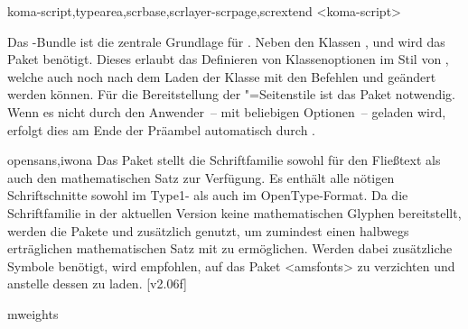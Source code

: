 \begin{packages}
\item[koma-script,typearea,scrbase,scrlayer-scrpage,scrextend]<koma-script>
  \begin{Declaration*}{}
  \begin{Declaration*}{}
  \begin{Declaration*}{}
  \begin{Declaration*}{}
  Das \KOMAScript-Bundle ist die zentrale Grundlage für \TUDScript. Neben den 
  Klassen ,  und  wird das Paket 
   benötigt. Dieses erlaubt das Definieren von Klassenoptionen 
  im Stil von \KOMAScript, welche auch noch nach dem Laden der Klasse mit den 
  Befehlen  und  geändert werden können. Für 
  die Bereitstellung der "=Seitenstile ist das Paket 
   notwendig. Wenn es nicht durch den Anwender~-- mit 
  beliebigen Optionen~-- geladen wird, erfolgt dies am Ende der Präambel 
  automatisch durch \TUDScript.
  \end{Declaration*}
  \end{Declaration*}
  \end{Declaration*}
  \end{Declaration*}
\item[opensans,iwona]
  Das Paket  stellt die Schriftfamilie \OpenSans sowohl für 
  den Fließtext als auch den mathematischen Satz zur Verfügung. Es enthält alle 
  nötigen Schriftschnitte sowohl im Type1- als auch im OpenType-Format. Da die 
  Schriftfamilie in der aktuellen Version keine mathematischen Glyphen 
  bereitstellt, werden die Pakete  und  
  zusätzlich genutzt, um zumindest einen halbwegs erträglichen mathematischen 
  Satz mit \OpenSans zu ermöglichen. Werden dabei zusätzliche Symbole benötigt, 
  wird empfohlen, auf das Paket <amsfonts> zu verzichten und 
  anstelle dessen  zu laden.
  [v2.06f]
\item[mweights]
\end{packages}
